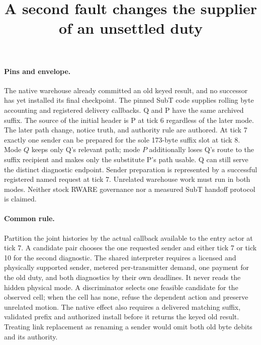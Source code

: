 \documentclass{article}
\title{A second fault changes the supplier of an unsettled duty}
\begin{document}
\maketitle
\paragraph{Pins and envelope.}
The native warehouse already committed an old keyed result, and no successor has yet installed its final checkpoint. The pinned SubT code supplies rolling byte accounting and registered delivery callbacks. Q and P have the same archived suffix. The source of the initial header is P at tick 6 regardless of the later mode. The later path change, notice truth, and authority rule are authored. At tick 7 exactly one sender can be prepared for the sole 173-byte suffix slot at tick 8. Mode \(Q\) keeps only Q's relevant path; mode \(P\) additionally loses Q's route to the suffix recipient and makes only the substitute P's path usable. Q can still serve the distinct diagnostic endpoint. Sender preparation is represented by a successful registered named request at tick 7. Unrelated warehouse work must run in both modes. Neither stock RWARE governance nor a measured SubT handoff protocol is claimed.

\paragraph{Common rule.}
Partition the joint histories by the actual callback available to the entry actor at tick 7. A candidate pair chooses the one requested sender and either tick 7 or tick 10 for the second diagnostic. The shared interpreter requires a licensed and physically supported sender, metered per-transmitter demand, one payment for the old duty, and both diagnostics by their own deadlines. It never reads the hidden physical mode. A discriminator selects one feasible candidate for the observed cell; when the cell has none, refuse the dependent action and preserve unrelated motion. The native effect also requires a delivered matching suffix, validated prefix and authorized install before it returns the keyed old result. Treating link replacement as renaming a sender would omit both old byte debits and its authority.
\end{document}
